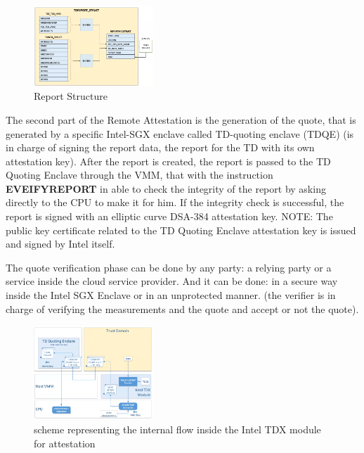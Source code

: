 \begin{figure}[H]
    \centering
    \includegraphics[width=0.4\textwidth]{img/report struct.png}
    \caption{Report Structure}
    \label{fig:report struct}
\end{figure}

The second part of the Remote Attestation is the generation of the
quote, that is generated by a specific Intel-SGX enclave called
TD-quoting enclave (TDQE) (is in charge of signing the report data,
the report for the TD with its own attestation key).
After the report is created, the report is passed to the TD Quoting
Enclave through the VMM, that with the instruction
\textbf{EVEIFYREPORT} in able to check the integrity of the report by
asking directly to the CPU to make it for him.  If the integrity check
is successful, the report is signed with an elliptic curve DSA-384
attestation key. NOTE: The public key certificate related to the TD
Quoting Enclave attestation key is issued and signed by Intel itself.
\bigskip

The quote verification phase can be done by any party: a relying party
or a service inside the cloud service provider. And it can be done: in
a secure way inside the Intel SGX Enclave or in an unprotected manner. 
(the verifier is in charge of verifying the measurements and the quote
and accept or not the quote).


\begin{figure}[H]
  \centering
  \includegraphics[width=0.4\textwidth]{img/schema tdx attestation.png}
  \caption{scheme representing the internal flow inside the Intel TDX module for attestation}
  \label{fig:schema tdx attestation}
\end{figure}

